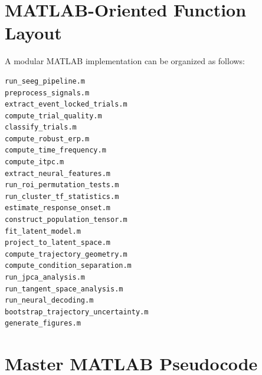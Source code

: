\documentclass[11pt]{report}
\begin{document}
\section{MATLAB-Oriented Function Layout}

A modular MATLAB implementation can be organized as follows:

\begin{verbatim}
run_seeg_pipeline.m
preprocess_signals.m
extract_event_locked_trials.m
compute_trial_quality.m
classify_trials.m
compute_robust_erp.m
compute_time_frequency.m
compute_itpc.m
extract_neural_features.m
run_roi_permutation_tests.m
run_cluster_tf_statistics.m
estimate_response_onset.m
construct_population_tensor.m
fit_latent_model.m
project_to_latent_space.m
compute_trajectory_geometry.m
compute_condition_separation.m
run_jpca_analysis.m
run_tangent_space_analysis.m
run_neural_decoding.m
bootstrap_trajectory_uncertainty.m
generate_figures.m
\end{verbatim}

\section{Master MATLAB Pseudocode}
\end{document}
